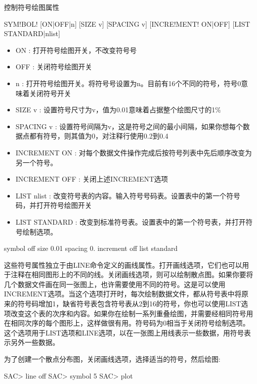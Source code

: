 \label{cmd:symbol}

控制符号绘图属性

\begin{SACSTX}
SYM!BOL! [ON|OFF|n] [SIZE v] [SPACING v] [INCRE!MENT! ON|OFF] [LIST STANDARD|nlist]
\end{SACSTX}

\begin{itemize}
\item ON : 打开符号绘图开关，不改变符号号 
\item OFF : 关闭符号绘图开关 
\item n : 打开符号绘图开关。将符号号设置为n。目前有16个不同的符号，符号0意味着关闭符号开关  
\item SIZE v : 设置符号尺寸为v，值为0.01意味着占据整个绘图尺寸的1\%	
\item SPACING v : 设置符号间隔为v，这是符号之间的最小间隔，如果你想每个数据点都有符号，则其值为0，对注释行使用0.2到0.4
\item INCREMENT {ON} : 对每个数据文件操作完成后按符号列表中先后顺序改变为另一个符号。 
\item INCREMENT OFF : 关闭上述INCREMENT选项 
\item LIST nlist : 改变符号表的内容。输入符号号码表。设置表中的第一个符号码，并打开符号绘图开关 
\item LIST STANDARD : 改变到标准符号表。设置表中的第一个符号表，并打开符号绘制选项。 
\end{itemize}

\begin{SACDFT}
symbol off size 0.01 spacing 0. increment off list standard
\end{SACDFT}

这些符号属性独立于由LINE命令定义的画线属性。打开画线选项，它们也可以用于注释在相同图形上的不同的线。关闭画线选项，则可以绘制散点图。如果你要将几个数据文件画在同一张图上，也许需要使用不同的符号。这是可以使用INCREMENT选项。当这个选项打开时，每次绘制数据文件，都从符号表中将原来的符号码增加1，缺省符号表包含符号表从2到16的符号，你也可以使用LIST选项改变这个表的次序和内容。如果你在绘制一系列重叠绘图，并需要经相同符号用在相同次序的每个图形上，这样做很有用。符号码为0相当于关闭符号绘制选项。这个选项用于LIST选项和LINE选项，以在一张图上用线表示一些数据，用符号表示另外一些数据。

为了创建一个散点分布图，关闭画线选项，选择适当的符号，然后绘图:
\begin{SACCode}
SAC> line off
SAC> symbol 5
SAC> plot
\end{SACCode}


